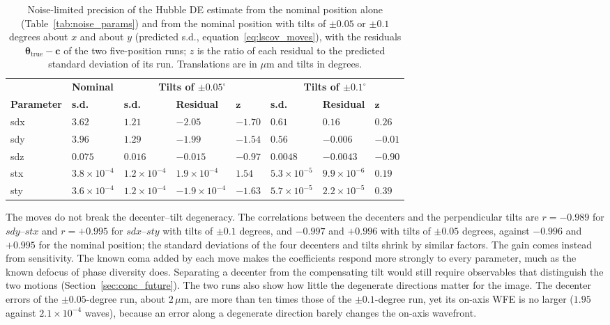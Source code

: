 \begin{table}
\centering
\small
\setlength{\tabcolsep}{4pt}
\caption[Noise-limited precision with known moves of the Hubble secondary.]{Noise-limited precision of the Hubble DE estimate from the nominal position alone (Table~\ref{tab:noise_params}) and from the nominal position with tilts of $\pm0.05$ or $\pm0.1$ degrees about $x$ and about $y$ (predicted s.d., equation~\ref{eq:lscov_moves}), with the residuals $\boldsymbol{\theta}_{\mathrm{true}}-\mathbf{c}$ of the two five-position runs; $z$ is the ratio of each residual to the predicted standard deviation of its run. Translations are in $\mu$m and tilts in degrees.}
\label{tab:noise_moves}
\begin{tabular}{llllllll}
\hline
 & \textbf{Nominal} & \multicolumn{3}{c}{\textbf{Tilts of $\boldsymbol{\pm0.05^{\circ}}$}} & \multicolumn{3}{c}{\textbf{Tilts of $\boldsymbol{\pm0.1^{\circ}}$}} \\
\textbf{Parameter} & \textbf{s.d.} & \textbf{s.d.} & \textbf{Residual} & $\boldsymbol{z}$ & \textbf{s.d.} & \textbf{Residual} & $\boldsymbol{z}$ \\
\hline
sdx & $3.62$ & $1.21$ & $-2.05$ & $-1.70$ & $0.61$ & $0.16$ & $0.26$ \\
sdy & $3.96$ & $1.29$ & $-1.99$ & $-1.54$ & $0.56$ & $-0.006$ & $-0.01$ \\
sdz & $0.075$ & $0.016$ & $-0.015$ & $-0.97$ & $0.0048$ & $-0.0043$ & $-0.90$ \\
stx & $3.8\times10^{-4}$ & $1.2\times10^{-4}$ & $1.9\times10^{-4}$ & $1.54$ & $5.3\times10^{-5}$ & $9.9\times10^{-6}$ & $0.19$ \\
sty & $3.6\times10^{-4}$ & $1.2\times10^{-4}$ & $-1.9\times10^{-4}$ & $-1.63$ & $5.7\times10^{-5}$ & $2.2\times10^{-5}$ & $0.39$ \\
\hline
\end{tabular}
\end{table}

The moves do not break the decenter--tilt degeneracy. The correlations between the decenters and the perpendicular tilts are $r=-0.989$ for $sdy$--$stx$ and $r=+0.995$ for $sdx$--$sty$ with tilts of $\pm0.1$ degrees, and $-0.997$ and $+0.996$ with tilts of $\pm0.05$ degrees, against $-0.996$ and $+0.995$ for the nominal position; the standard deviations of the four decenters and tilts shrink by similar factors. The gain comes instead from sensitivity. The known coma added by each move makes the coefficients respond more strongly to every parameter, much as the known defocus of phase diversity does. Separating a decenter from the compensating tilt would still require observables that distinguish the two motions (Section~\ref{sec:conc_future}). The two runs also show how little the degenerate directions matter for the image. The decenter errors of the $\pm0.05$-degree run, about $2\,\mu\mathrm{m}$, are more than ten times those of the $\pm0.1$-degree run, yet its on-axis WFE is no larger ($1.95$ against $2.1\times10^{-4}$ waves), because an error along a degenerate direction barely changes the on-axis wavefront.

